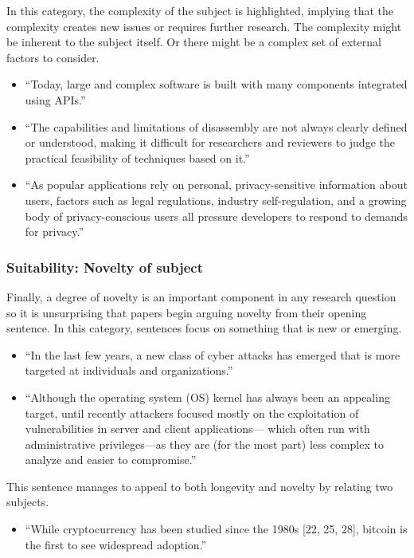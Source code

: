 \documentclass[sigconf,anonymous]{acmart}
\begin{document}
	In this category, the complexity of the subject is highlighted, implying that the complexity creates new issues or requires further research. The complexity might be inherent to the subject itself. Or there might be a complex set of external factors to consider.
	\begin{itemize}
		\item 	``Today, large and complex software is built with many components integrated using APIs.''
		
		\item ``The capabilities and limitations of disassembly are not always clearly defined or understood, making it difficult for researchers and reviewers to judge the practical feasibility of techniques based on it.''
		
		\item 	``As popular applications rely on personal, privacy-sensitive information about users, factors such as legal regulations, industry self-regulation, and a growing body of privacy-conscious users all pressure developers to respond to demands for privacy.''
	\end{itemize}
	
	
	\subsubsection{Suitability: Novelty of subject}
	
	Finally, a degree of novelty is an important component in any research question so it is unsurprising that papers begin arguing novelty from their opening sentence. In this category, sentences focus on something that is new or emerging. 
	\begin{itemize}
		\item 	``In the last few years, a new class of cyber attacks has emerged that is more targeted at individuals and organizations.''
		
		\item  ``Although the operating system (OS) kernel has always been an appealing target, until recently attackers focused mostly on the exploitation of vulnerabilities in server and client applications— which often run with administrative privileges—as they are (for the most part) less complex to analyze and easier to compromise.''
			\end{itemize}

This sentence manages to appeal to both longevity and novelty by relating two subjects.
	\begin{itemize}
		
		\item  ``While cryptocurrency has been studied since the 1980s [22, 25, 28], bitcoin is the first to see widespread adoption.''
		
	\end{itemize}
	
\end{document}
